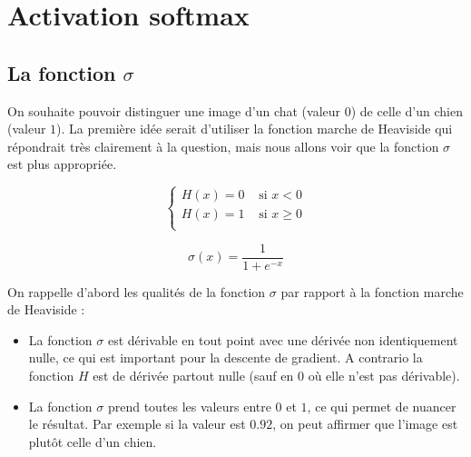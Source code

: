 \documentclass[11pt,class=report,crop=false]{standalone}
\begin{document}


\section{Activation softmax}


\subsection{La fonction $\sigma$}

On souhaite pouvoir distinguer une image d'un chat (valeur $0$) de celle d'un chien (valeur $1$). La première idée serait d'utiliser la fonction marche de Heaviside qui répondrait très clairement à la question, mais nous allons voir que la fonction $\sigma$ est plus appropriée.

\begin{minipage}{0.45\textwidth}
\begin{center}
\end{center}
$$\begin{cases}
H(x) = 0 & \text{ si } x < 0 \\
H(x) = 1  & \text{ si } x \ge 0 \\
\end{cases}$$

\end{minipage}
\qquad
\begin{minipage}{0.5\textwidth}
\begin{center}
\end{center}
$$\sigma(x) = \frac{1}{1+e^{-x}}$$
\end{minipage}

\bigskip




On rappelle d'abord les qualités de la fonction $\sigma$ par rapport à la fonction marche de Heaviside :
\begin{itemize}
  \item La fonction $\sigma$ est dérivable en tout point avec une dérivée non identiquement nulle, ce qui est important pour la descente de gradient. A contrario la fonction $H$ est de dérivée partout nulle (sauf en $0$ où elle n'est pas dérivable).
  
  \item La fonction $\sigma$ prend toutes les valeurs entre $0$ et $1$, ce qui permet de nuancer le résultat. Par exemple si la valeur est $0.92$, on peut affirmer que l'image est plutôt celle d'un chien.
\end{itemize}
\end{document}
